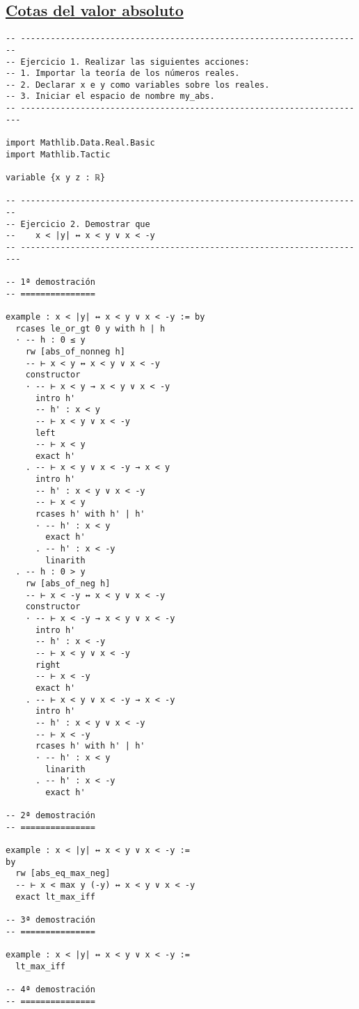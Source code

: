\subsection{\href{./src/Logica/Cotas\_del\_valor\_absoluto.lean}{Cotas del valor absoluto}}
\label{sec:org04870f8}
\begin{verbatim}
-- ---------------------------------------------------------------------
-- Ejercicio 1. Realizar las siguientes acciones:
-- 1. Importar la teoría de los números reales.
-- 2. Declarar x e y como variables sobre los reales.
-- 3. Iniciar el espacio de nombre my_abs.
-- ----------------------------------------------------------------------

import Mathlib.Data.Real.Basic
import Mathlib.Tactic

variable {x y z : ℝ}

-- ---------------------------------------------------------------------
-- Ejercicio 2. Demostrar que
--    x < |y| ↔ x < y ∨ x < -y
-- ----------------------------------------------------------------------

-- 1ª demostración
-- ===============

example : x < |y| ↔ x < y ∨ x < -y := by
  rcases le_or_gt 0 y with h | h
  · -- h : 0 ≤ y
    rw [abs_of_nonneg h]
    -- ⊢ x < y ↔ x < y ∨ x < -y
    constructor
    · -- ⊢ x < y → x < y ∨ x < -y
      intro h'
      -- h' : x < y
      -- ⊢ x < y ∨ x < -y
      left
      -- ⊢ x < y
      exact h'
    . -- ⊢ x < y ∨ x < -y → x < y
      intro h'
      -- h' : x < y ∨ x < -y
      -- ⊢ x < y
      rcases h' with h' | h'
      · -- h' : x < y
        exact h'
      . -- h' : x < -y
        linarith
  . -- h : 0 > y
    rw [abs_of_neg h]
    -- ⊢ x < -y ↔ x < y ∨ x < -y
    constructor
    · -- ⊢ x < -y → x < y ∨ x < -y
      intro h'
      -- h' : x < -y
      -- ⊢ x < y ∨ x < -y
      right
      -- ⊢ x < -y
      exact h'
    . -- ⊢ x < y ∨ x < -y → x < -y
      intro h'
      -- h' : x < y ∨ x < -y
      -- ⊢ x < -y
      rcases h' with h' | h'
      · -- h' : x < y
        linarith
      . -- h' : x < -y
        exact h'

-- 2ª demostración
-- ===============

example : x < |y| ↔ x < y ∨ x < -y :=
by
  rw [abs_eq_max_neg]
  -- ⊢ x < max y (-y) ↔ x < y ∨ x < -y
  exact lt_max_iff

-- 3ª demostración
-- ===============

example : x < |y| ↔ x < y ∨ x < -y :=
  lt_max_iff

-- 4ª demostración
-- ===============


\end{verbatim}
